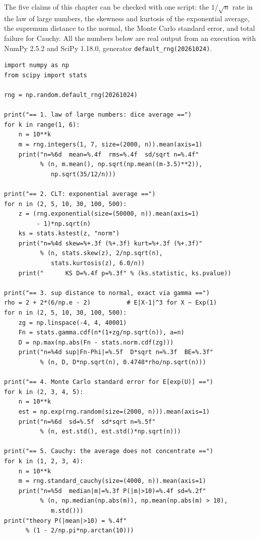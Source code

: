 The five claims of this chapter can be checked with one script: the $1/\sqrt n$
rate in the law of large numbers, the skewness and kurtosis of the exponential
average, the supremum distance to the normal, the Monte Carlo standard error, and
total failure for Cauchy. All the numbers below are real output from an execution
with NumPy 2.5.2 and SciPy 1.18.0, generator \texttt{default\_rng(20261024)}.

\begin{lab}
\begin{verbatim}
import numpy as np
from scipy import stats

rng = np.random.default_rng(20261024)

print("== 1. law of large numbers: dice average ==")
for k in range(1, 6):
    n = 10**k
    m = rng.integers(1, 7, size=(2000, n)).mean(axis=1)
    print("n=%6d  mean=%.4f  rms=%.4f  sd/sqrt n=%.4f"
          % (n, m.mean(), np.sqrt(np.mean((m-3.5)**2)),
             np.sqrt(35/12/n)))

print("== 2. CLT: exponential average ==")
for n in (2, 5, 10, 30, 100, 500):
    z = (rng.exponential(size=(50000, n)).mean(axis=1)
         - 1)*np.sqrt(n)
    ks = stats.kstest(z, "norm")
    print("n=%4d skew=%+.3f (%+.3f) kurt=%+.3f (%+.3f)"
          % (n, stats.skew(z), 2/np.sqrt(n),
             stats.kurtosis(z), 6.0/n))
    print("      KS D=%.4f p=%.3f" % (ks.statistic, ks.pvalue))

print("== 3. sup distance to normal, exact via gamma ==")
rho = 2 + 2*(6/np.e - 2)          # E|X-1|^3 for X ~ Exp(1)
for n in (2, 5, 10, 30, 100, 500):
    zg = np.linspace(-4, 4, 40001)
    Fn = stats.gamma.cdf(n*(1+zg/np.sqrt(n)), a=n)
    D = np.max(np.abs(Fn - stats.norm.cdf(zg)))
    print("n=%4d sup|Fn-Phi|=%.5f  D*sqrt n=%.3f  BE=%.3f"
          % (n, D, D*np.sqrt(n), 0.4748*rho/np.sqrt(n)))

print("== 4. Monte Carlo standard error for E[exp(U)] ==")
for k in (2, 3, 4, 5):
    n = 10**k
    est = np.exp(rng.random(size=(2000, n))).mean(axis=1)
    print("n=%6d  sd=%.5f  sd*sqrt n=%.5f"
          % (n, est.std(), est.std()*np.sqrt(n)))

print("== 5. Cauchy: the average does not concentrate ==")
for k in (1, 2, 3, 4):
    n = 10**k
    m = rng.standard_cauchy(size=(4000, n)).mean(axis=1)
    print("n=%5d  median|m|=%.3f P(|m|>10)=%.4f sd=%.2f"
          % (n, np.median(np.abs(m)), np.mean(np.abs(m) > 10),
             m.std()))
print("theory P(|mean|>10) = %.4f"
      % (1 - 2/np.pi*np.arctan(10)))
\end{verbatim}
\end{lab}


